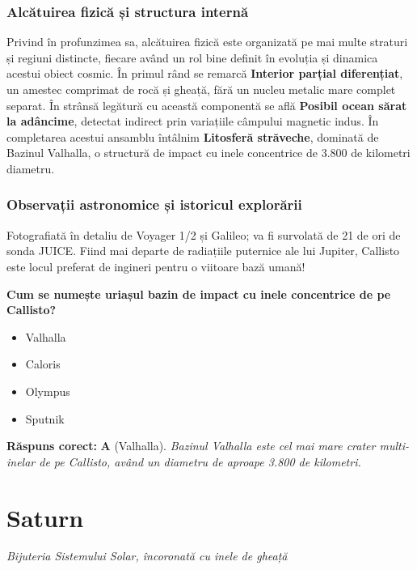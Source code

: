 \subsubsection*{Alcătuirea fizică și structura internă}
Privind în profunzimea sa, alcătuirea fizică este organizată pe mai multe straturi și regiuni distincte, fiecare având un rol bine definit în evoluția și dinamica acestui obiect cosmic. În primul rând se remarcă \textbf{Interior parțial diferențiat}, un amestec comprimat de rocă și gheață, fără un nucleu metalic mare complet separat. În strânsă legătură cu această componentă se află \textbf{Posibil ocean sărat la adâncime}, detectat indirect prin variațiile câmpului magnetic indus. În completarea acestui ansamblu întâlnim \textbf{Litosferă străveche}, dominată de Bazinul Valhalla, o structură de impact cu inele concentrice de 3.800 de kilometri diametru.

\subsubsection*{Observații astronomice și istoricul explorării}
Fotografiată în detaliu de Voyager 1/2 și Galileo; va fi survolată de 21 de ori de sonda JUICE. Fiind mai departe de radiațiile puternice ale lui Jupiter, Callisto este locul preferat de ingineri pentru o viitoare bază umană!

\vspace{6pt}
\begin{tcolorbox}[orbitarquiz, title={\textbf{Întrebare de verificare \#13: Callisto}}]
\textbf{Cum se numește uriașul bazin de impact cu inele concentrice de pe Callisto?}
\begin{itemize}[leftmargin=2.2em, itemsep=2pt, topsep=4pt]
  \item[$\square$ \textbf{A.}] Valhalla
  \item[$\square$ \textbf{B.}] Caloris
  \item[$\square$ \textbf{C.}] Olympus
  \item[$\square$ \textbf{D.}] Sputnik
\end{itemize}
\vspace{2pt}
{\footnotesize\color{orbitarMuted}\textbf{Răspuns corect:} \textbf{A} (Valhalla). \emph{Bazinul Valhalla este cel mai mare crater multi-inelar de pe Callisto, având un diametru de aproape 3.800 de kilometri.}}
\end{tcolorbox}
\clearpage


\section{Saturn}
\label{sec:body-saturn}
\vspace{-4pt}
{\large\itshape\color{orbitarAccent} Bijuteria Sistemului Solar, încoronată cu inele de gheață}\\[4pt]


